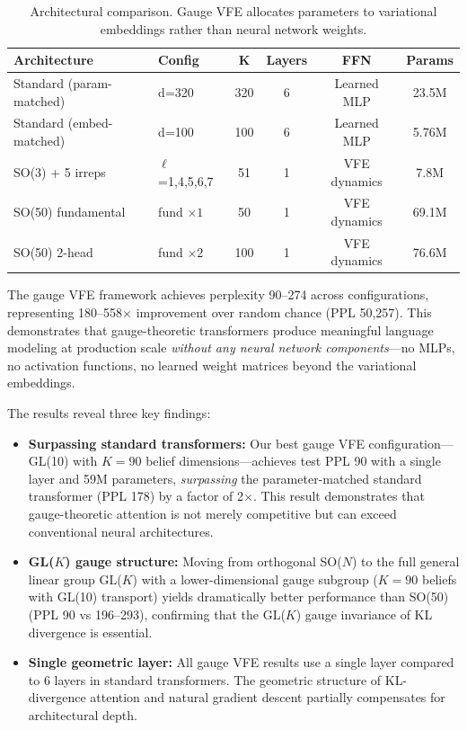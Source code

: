 \documentclass[twoside,11pt]{article}
\begin{document}
\begin{table}[t]
\centering
\caption{Architectural comparison. Gauge VFE allocates parameters to variational embeddings rather than neural network weights.}
\label{tab:arch_comparison}
\begin{tabular}{llcccc}
\toprule
\textbf{Architecture} & \textbf{Config} & \textbf{K} & \textbf{Layers} & \textbf{FFN} & \textbf{Params} \\
\midrule
Standard (param-matched) & d=320 & 320 & 6 & Learned MLP & 23.5M \\
Standard (embed-matched) & d=100 & 100 & 6 & Learned MLP & 5.76M \\
\midrule
SO(3) + 5 irreps & $\ell$=1,4,5,6,7 & 51 & 1 & VFE dynamics & 7.8M \\
SO(50) fundamental & fund $\times 1$ & 50 & 1 & VFE dynamics & 69.1M \\
SO(50) 2-head & fund $\times 2$ & 100 & 1 & VFE dynamics & 76.6M \\
\bottomrule
\end{tabular}
\end{table}

The gauge VFE framework achieves perplexity 90--274 across configurations, representing 180--558$\times$ improvement over random chance (PPL 50,257). This demonstrates that gauge-theoretic transformers produce meaningful language modeling at production scale \emph{without any neural network components}---no MLPs, no activation functions, no learned weight matrices beyond the variational embeddings.

The results reveal three key findings:

\begin{itemize}
  \item \textbf{Surpassing standard transformers:} Our best gauge VFE configuration---GL(10) with $K{=}90$ belief dimensions---achieves test PPL 90 with a single layer and 59M parameters, \emph{surpassing} the parameter-matched standard transformer (PPL 178) by a factor of 2$\times$. This result demonstrates that gauge-theoretic attention is not merely competitive but can exceed conventional neural architectures.

  \item \textbf{GL($K$) gauge structure:} Moving from orthogonal SO($N$) to the full general linear group GL($K$) with a lower-dimensional gauge subgroup ($K{=}90$ beliefs with GL(10) transport) yields dramatically better performance than SO(50) (PPL 90 vs 196--293), confirming that the GL($K$) gauge invariance of KL divergence is essential.

  \item \textbf{Single geometric layer:} All gauge VFE results use a single layer compared to 6 layers in standard transformers. The geometric structure of KL-divergence attention and natural gradient descent partially compensates for architectural depth.
\end{itemize}
\end{document}
